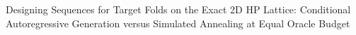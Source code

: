 Designing Sequences for Target Folds on the Exact 2D HP Lattice: Conditional Autoregressive Generation versus Simulated Annealing at Equal Oracle Budget
